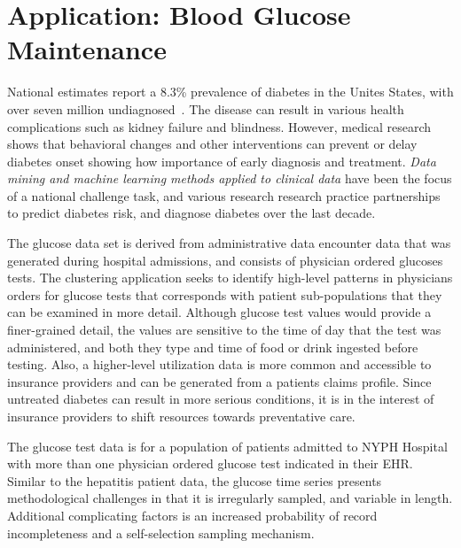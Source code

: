 \section{Application: Blood Glucose Maintenance}
National estimates report a 8.3\% prevalence of diabetes in the Unites States, with over seven million undiagnosed~\cite{cdc}.  The disease can result in various health complications such as kidney failure and blindness.  However, medical research shows that behavioral changes and other interventions can prevent or delay diabetes onset showing how importance of early diagnosis and treatment.   \emph{Data mining and  machine learning methods applied to clinical data} have been the focus of a national challenge task, and various research research practice partnerships to predict diabetes risk, and diagnose diabetes over the last decade\cite{Kaggle, HHP}.

The glucose data set is derived from administrative data encounter data that was generated during hospital admissions, and consists of physician ordered glucoses tests.  The clustering application seeks to identify high-level patterns in physicians orders for glucose tests that corresponds with patient sub-populations that they can be examined in more detail.  Although glucose test values would provide a finer-grained detail, the values are sensitive to the time of day that the test was administered, and both they type and time of food or drink ingested before testing.  Also, a higher-level utilization data is more common and accessible to insurance providers and can be generated from a patients claims profile.  Since untreated diabetes can result in more serious conditions, it is in the interest of insurance providers to shift resources towards preventative care.

The glucose test data is for a population of patients admitted to NYPH Hospital with more than one physician ordered glucose test indicated in their EHR. Similar to the hepatitis patient data, the glucose time series presents methodological challenges in that it is irregularly sampled, and variable in length.  Additional complicating factors is an increased probability of record incompleteness and a self-selection sampling mechanism.

